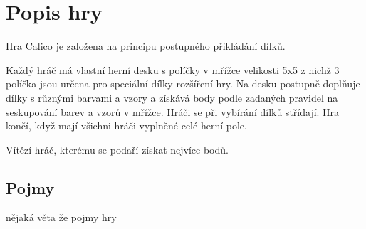 
\chapter{Popis hry}

Hra Calico je založena na principu postupného přikládání dílků. 

Každý hráč má vlastní herní desku s políčky v mřížce velikosti 5x5 z nichž 3 políčka jsou určena pro speciální dílky rozšíření hry. Na desku postupně doplňuje dílky s různými barvami a vzory a získává body podle zadaných pravidel na seskupování barev a vzorů v mřížce. Hráči se při vybírání dílků střídají. Hra končí, když mají všichni hráči vyplněné celé herní pole.

Vítězí hráč, kterému se podaří získat nejvíce bodů.

\section{Pojmy}

nějaká věta že pojmy hry

